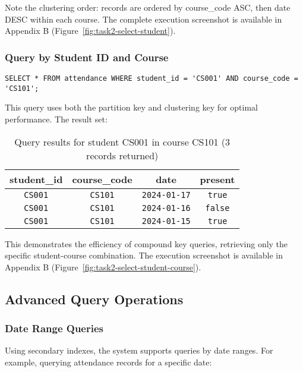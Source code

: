 Note the clustering order: records are ordered by course\_code ASC, then date DESC within each course. The complete execution screenshot is available in Appendix B (Figure~\ref{fig:task2-select-student}).

\subsubsection{Query by Student ID and Course}
\begin{verbatim}
SELECT * FROM attendance WHERE student_id = 'CS001' AND course_code = 'CS101';
\end{verbatim}

This query uses both the partition key and clustering key for optimal performance. The result set:

\begin{table}[H]
  \centering
  \footnotesize
  \begin{tabular}{|c|c|c|c|}
    \hline
    \textbf{student\_id} & \textbf{course\_code} & \textbf{date} & \textbf{present} \\
    \hline
    \texttt{CS001}                & \texttt{CS101}                 & \texttt{2024-01-17}    & \texttt{true}             \\
    \texttt{CS001}                & \texttt{CS101}                 & \texttt{2024-01-16}    & \texttt{false}            \\
    \texttt{CS001}                & \texttt{CS101}                 & \texttt{2024-01-15}    & \texttt{true}             \\
    \hline
  \end{tabular}
  \caption{Query results for student CS001 in course CS101 (3 records returned)}
\end{table}

This demonstrates the efficiency of compound key queries, retrieving only the specific student-course combination. The execution screenshot is available in Appendix B (Figure~\ref{fig:task2-select-student-course}).

\subsection{Advanced Query Operations}

\subsubsection{Date Range Queries}
Using secondary indexes, the system supports queries by date ranges. For example, querying attendance records for a specific date:


